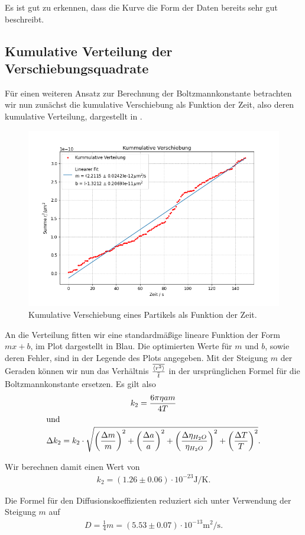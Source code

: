 Es ist gut zu erkennen, dass die Kurve die Form der Daten bereits sehr gut beschreibt.

\subsection{Kumulative Verteilung der Verschiebungsquadrate}

Für einen weiteren Ansatz zur Berechnung der Boltzmannkonstante betrachten wir nun zunächst die kumulative Verschiebung als Funktion der Zeit, also deren kumulative Verteilung, dargestellt in .

\begin{figure}[H]
  \centering
  \includegraphics[width=.90\textwidth]{files/brown3.png}
  \caption{Kumulative Verschiebung eines Partikels als Funktion der Zeit.}
  \label{fig:brown3}
\end{figure}
An die Verteilung fitten wir eine standardmäßige lineare Funktion der Form $mx + b$, im Plot dargestellt in Blau. Die optimierten Werte für $m$ und $b$, sowie deren Fehler, sind in der Legende des Plots angegeben. Mit der Steigung $m$ der Geraden können wir nun das Verhältnis $\frac{\overline{\expval{r^2}}}{\overline{t}}$ in der ursprünglichen Formel für die Boltzmannkonstante ersetzen. Es gilt also
\begin{gather}
  k_{2} = \frac{6\pi\eta a m}{4 T}\\
  \intertext{und}
  \Delta k_{2} = k_{2} \cdot \sqrt{\qty(\frac{\Delta m}{m})^{2} + \qty(\frac{\Delta a}{a})^{2} + \qty(\frac{\Delta \eta_{H_2 O}}{\eta_{H_2 O}})^{2} + \qty(\frac{\Delta T}{T})^{2}}.
\end{gather}

Wir berechnen damit einen Wert von
\begin{align}
  k_{2} = (1.26 \pm 0.06) \cdot 10^{-23} \si{\joule\per\kelvin}.
\end{align}

Die Formel für den Diffusionskoeffizienten reduziert sich unter Verwendung der Steigung $m$ auf
\begin{align}
  D = \frac{1}{4} m = (5.53 \pm 0.07) \cdot 10^{-13} \si{\meter\squared\per\second}.
\end{align}